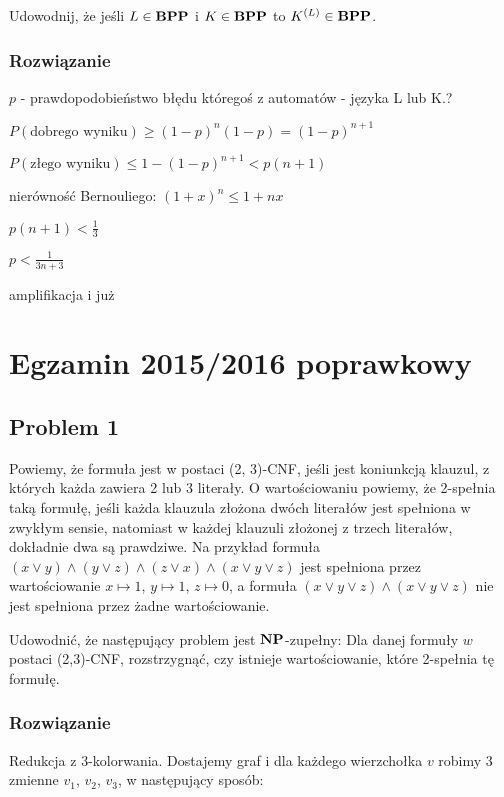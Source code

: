 Udowodnij, że jeśli $L \in \textbf{BPP}$ i $K \in \textbf{BPP}$ to $K^{(L)} \in \textbf{BPP}$.


\subsubsection*{Rozwiązanie}

$p$ - prawdopodobieństwo błędu któregoś z automatów - języka L lub K.?

$P(\text{dobrego wyniku}) \geq (1 - p)^n(1-p) = (1-p)^{n+1}$

$P(\text{złego wyniku}) \leq 1 - (1 - p)^{n+1} < p(n+1)$

nierówność Bernouliego: $(1 + x)^n \leq 1 + nx$

$p(n+1) < \frac{1}{3}$

$p < \frac{1}{3n + 3}$

amplifikacja i już

\section{Egzamin 2015/2016 poprawkowy}

\subsection{Problem 1}
Powiemy, że formuła jest w postaci (2, 3)-CNF, jeśli jest koniunkcją klauzul, z których każda zawiera 2 lub 3 literały. O wartościowaniu powiemy, że 2-spełnia taką formułę, jeśli każda klauzula złożona dwóch literałów jest spełniona w zwykłym sensie, natomiast w każdej klauzuli złożonej z trzech literałów, dokładnie dwa są prawdziwe. Na przykład formuła $(x \lor y) \land (y \lor z) \land (z \lor x) \land (x \lor y \lor z)$ jest spełniona przez wartościowanie $x \mapsto 1$, $y \mapsto 1$, $z \mapsto 0$, a formuła $(x \lor y \lor z) \land (x \lor y \lor z)$ nie jest spełniona przez żadne wartościowanie.

Udowodnić, że następujący problem jest $\textbf{NP}$-zupełny: Dla danej formuły $w$ postaci (2,3)-CNF, rozstrzygnąć, czy istnieje wartościowanie, które 2-spełnia tę formułę.

\subsubsection*{Rozwiązanie}

Redukcja z 3-kolorwania. Dostajemy graf i dla każdego wierzchołka $v$ robimy 3 zmienne $v_1$, $v_2$, $v_3$, w następujący sposób:

